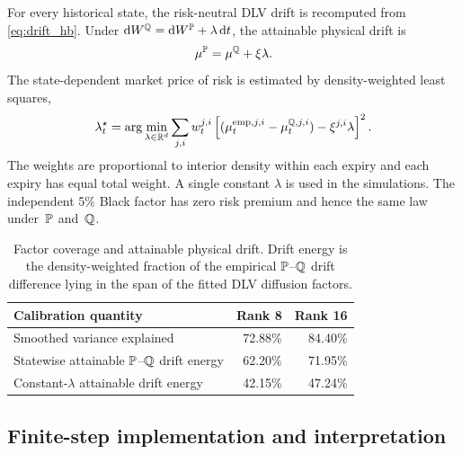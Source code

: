 {For every historical state, the risk-neutral DLV drift is recomputed from
\eqref{eq:drift_hb}.  Under
$\mathrm d W^{\mathbb Q}=\mathrm d W^{\mathbb P}+\lambda\,\mathrm d t$, the attainable physical drift is
\begin{equation}\label{eq:numerics-p-drift}
  \mu^{\mathbb P}=\mu^{\mathbb Q}+\xi\lambda.
\end{equation}
The state-dependent market price of risk is estimated by density-weighted
least squares,
\begin{equation}\label{eq:numerics-statewise-lambda}
  \lambda_t^\star
  =\arg\min_{\lambda\in\mathbb R^d}
    \sum_{j,i}w_t^{j,i}
    \left[
      (\mu_t^{\mathrm{emp},j,i}-\mu_t^{\mathbb Q,j,i})
      -\xi^{j,i}\lambda
    \right]^2.
\end{equation}
The weights are proportional to interior density within each expiry and each
expiry has equal total weight.  A single constant $\lambda$ is used in the
simulations.  The independent 5\% Black factor has zero risk premium and hence
the same law under~$\mathbb P$ and~$\mathbb Q$.

\begin{table}[H]
\centering
\small
\begin{tabular}{lrr}
\toprule
Calibration quantity & Rank 8 & Rank 16\\
\midrule
Smoothed variance explained & 72.88\% & 84.40\%\\
Statewise attainable $\mathbb P$--$\mathbb Q$ drift energy & 62.20\% & 71.95\%\\
Constant-$\lambda$ attainable drift energy & 42.15\% & 47.24\%\\
\bottomrule
\end{tabular}
\caption{Factor coverage and attainable physical drift.  Drift energy is the
density-weighted fraction of the empirical $\mathbb P$--$\mathbb Q$ drift difference lying
in the span of the fitted DLV diffusion factors.}
\label{tab:numerics-calibration}
\end{table}

\subsection{Finite-step implementation and interpretation}
\label{sec:numerics-scheme}

}

